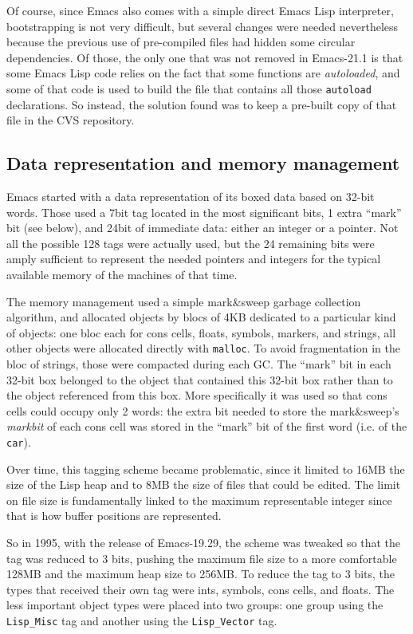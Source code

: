 \documentclass[format=acmsmall, review]{acmart}
\newcommand \Elisp {Emacs Lisp}
\begin{document}
Of course, since Emacs also comes with a simple direct \Elisp{} interpreter,
bootstrapping is not very difficult, but several changes were needed
nevertheless because the previous use of pre-compiled files had hidden some
circular dependencies.  Of those, the only one that was not removed in
Emacs-21.1 is that some \Elisp{} code relies on the fact that some
functions are \emph{autoloaded}, and some of that code is used to build the
file that contains all those \texttt{autoload} declarations.  So instead,
the solution found was to keep a pre-built copy of that file in the
CVS repository.

\subsection{Data representation and memory management}
\label{sec:data-representation}

Emacs started with a data representation of its boxed data based on 32-bit
words.  Those used a 7bit tag located in the most significant bits, 1 extra
``mark'' bit (see below), and 24bit of immediate data: either an integer or
a pointer.  Not all the possible 128 tags were actually used, but the 24
remaining bits were amply sufficient to represent the needed pointers and
integers for the typical available memory of the machines of that time.

The memory management used a simple mark\&sweep garbage collection
algorithm, and allocated objects by blocs of 4KB dedicated to a particular
kind of objects: one bloc each for cons cells, floats, symbols, markers, and
strings, all other objects were allocated directly with \texttt{malloc}.
To avoid fragmentation in the bloc of strings, those were compacted during
each GC.  The ``mark'' bit in each 32-bit box belonged to the object
that contained this 32-bit box rather than to the object referenced from
this box.  More specifically it was used so that cons cells could
occupy only 2 words: the extra bit needed to store the mark\&sweep's
\emph{markbit} of each cons cell was stored in the ``mark'' bit of the first
word (i.e. of the \texttt{car}).

Over time, this tagging scheme became problematic, since it limited to 16\;MB
the size of the Lisp heap and to 8\;MB the size of files that could be edited.
The limit on file size is fundamentally linked to the maximum representable
integer since that is how buffer positions are represented.

So in 1995, with the release of Emacs-19.29,
the scheme was tweaked so that the tag was reduced to
3 bits, pushing the maximum file size to a more comfortable 128MB and the
maximum heap size to 256\;MB.  To reduce the tag to 3 bits,
the types that received their own tag were ints, symbols, cons cells, and floats.
The less important
object types were placed into two groups: one group using the
\texttt{Lisp\_Misc} tag and another using the \texttt{Lisp\_Vector}
tag.
\end{document}
